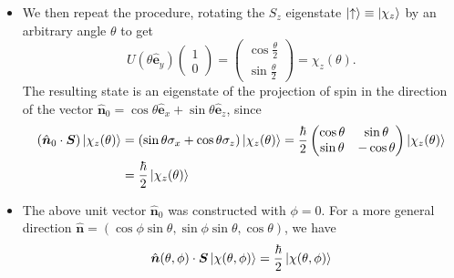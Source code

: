 \documentclass[11pt, a4paper]{article}
\renewcommand{\vec}[1]{\bm{#1}}  %
\newcommand{\uvec}[1]{\hat{\vec{#1}}}  %
\newcommand{\ua}{\uparrow}  %
\renewcommand{\S}{\vec{S}}  %
\begin{document}
\begin{itemize}
	\item We then repeat the procedure, rotating the $ S_{z} $ eigenstate $ \ket{\ua} \equiv \ket{\chi_{z}} $ by an arbitrary angle $ \theta $ to get
	\begin{equation*}
		U(\theta \uvec{e}_{y})
		\begin{pmatrix}
			1\\
			0
		\end{pmatrix}
		=
		\begin{pmatrix}
			\cos \frac{\theta}{2}\\
			\sin \frac{\theta}{2}
		\end{pmatrix}
        = \chi_{z}(\theta).
	\end{equation*}
	The resulting state is an eigenstate of the projection of spin in the direction of the vector $ \uvec{n}_{0} = \cos \theta \uvec{e}_{x} + \sin \theta \uvec{e}_{z} $, since
	\begin{align*}
		(\uvec{n}_{0}\cdot \vec{S})\ket{\chi_{z}(\theta)} &= (\sin \theta \sigma_{x} + \cos \theta \sigma_{z})\ket{\chi_{z}(\theta)} = \frac{\hbar}{2}
		\begin{pmatrix}
			\cos \theta & \sin \theta\\
			\sin \theta & - \cos \theta
		\end{pmatrix}
		\ket{\chi_{z}(\theta)}\\
		& = \frac{\hbar}{2}\ket{\chi_{z}(\theta)}
	\end{align*}
	
    \item The above unit vector $ \uvec{n}_{0} $ was constructed with $ \phi = 0 $. For a more general direction $ \uvec{n} = (\cos \phi \sin \theta, \sin \phi \sin \theta, \cos \theta) $, we have
	\begin{equation*}
		\uvec{n}(\theta, \phi) \cdot \S \ket{\chi(\theta, \phi)} = \frac{\hbar}{2} \ket{\chi(\theta, \phi)}
	\end{equation*}
	

\end{itemize}
\end{document}
